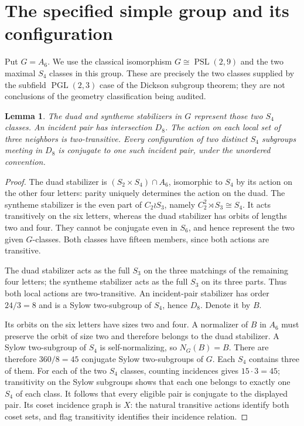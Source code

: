 \documentclass[11pt]{article}
\newtheorem{lemma}{Lemma}
\newcommand{\PSL}{\operatorname{PSL}}
\begin{document}
\section{The specified simple group and its configuration}
Put $G=A_6$. We use the classical isomorphism $G\cong\PSL(2,9)$
and the two maximal $S_4$ classes in this group. These are precisely
the two classes supplied by the subfield $\operatorname{PGL}(2,3)$
case of the Dickson subgroup theorem; they are not conclusions of the
geometry classification being audited.

\begin{lemma}\label{configuration}
The duad and syntheme stabilizers in $G$ represent those two $S_4$
classes. An incident pair has intersection $D_8$. The action on each
local set of three neighbors is two-transitive. Every configuration
of two distinct $S_4$ subgroups meeting in $D_8$ is conjugate to one
such incident pair, under the unordered convention.
\end{lemma}
\begin{proof}
The duad stabilizer is $(S_2\times S_4)\cap A_6$, isomorphic to
$S_4$ by its action on the other four letters: parity uniquely
determines the action on the duad. The syntheme stabilizer is the
even part of $C_2\wr S_3$, namely $C_2^2\rtimes S_3\cong S_4$.
It acts transitively on the six letters, whereas the duad stabilizer
has orbits of lengths two and four. They cannot be conjugate even
in $S_6$, and hence represent the two given $G$-classes.
Both classes have fifteen members, since both actions are transitive.

The duad stabilizer acts as the full $S_3$ on the three matchings of
the remaining four letters; the syntheme stabilizer acts as the full
$S_3$ on its three parts. Thus both local actions are two-transitive.
An incident-pair stabilizer has order $24/3=8$ and is a Sylow
two-subgroup of $S_4$, hence $D_8$. Denote it by $B$.

Its orbits on the six letters have sizes two and four. A normalizer
of $B$ in $A_6$ must preserve the orbit of size two and therefore
belongs to the duad stabilizer. A Sylow two-subgroup of $S_4$ is
self-normalizing, so $N_G(B)=B$. There are therefore $360/8=45$
conjugate Sylow two-subgroups of $G$. Each $S_4$ contains three of
them. For each of the two $S_4$ classes, counting incidences gives
$15\cdot3=45$; transitivity on the Sylow subgroups shows that each
one belongs to exactly one $S_4$ of each class. It follows that every
eligible pair is conjugate to the displayed pair. Its coset incidence
graph is $X$: the natural transitive actions identify both coset sets,
and flag transitivity identifies their incidence relation.
\end{proof}
\end{document}
